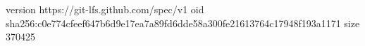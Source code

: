 version https://git-lfs.github.com/spec/v1
oid sha256:c0e774cfeef647b6d9e17ea7a89fd6dde58a300fe21613764c17948f193a1171
size 370425
